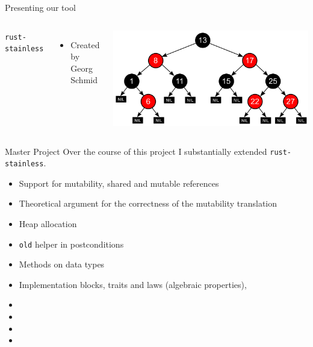 \maketitle

\begin{frame}{Presenting our tool}
  \begin{columns}
  {\Large\texttt{rust-stainless}}
  \begin{itemize}
  \item Created by Georg Schmid
  \end{itemize}

  \centering
  \includegraphics[width=\textwidth]{img/rbtree.png}
\end{columns}
\end{frame}

\begin{frame}{Master Project}
Over the course of this project I substantially extended \texttt{rust-stainless}.
\begin{itemize}
\item Support for mutability, shared and mutable references
\item {Theoretical argument for the correctness of the mutability translation}
\item Heap allocation
\item \lstinline!old! helper in postconditions
\item Methods on data types
\item {Implementation blocks, traits and laws (algebraic properties),}
\item {}
\item {}
\item {}
\item {}
\end{itemize}
\end{frame}

